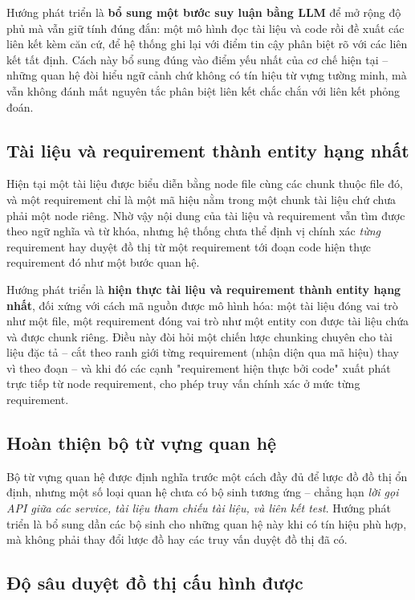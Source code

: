 Hướng phát triển là \textbf{bổ sung một bước suy luận bằng LLM} để mở rộng độ phủ mà vẫn giữ tính đúng đắn: một mô hình đọc tài liệu và code rồi đề xuất các liên kết kèm căn cứ, để hệ thống ghi lại với điểm tin cậy phân biệt rõ với các liên kết tất định. Cách này bổ sung đúng vào điểm yếu nhất của cơ chế hiện tại -- những quan hệ đòi hiểu ngữ cảnh chứ không có tín hiệu từ vựng tường minh, mà vẫn không đánh mất nguyên tắc phân biệt liên kết chắc chắn với liên kết phỏng đoán.

\subsection{Tài liệu và requirement thành entity hạng nhất}

Hiện tại một tài liệu được biểu diễn bằng node file cùng các chunk thuộc file đó, và một requirement chỉ là một mã hiệu nằm trong một chunk tài liệu chứ chưa phải một node riêng. Nhờ vậy nội dung của tài liệu và requirement vẫn tìm được theo ngữ nghĩa và từ khóa, nhưng hệ thống chưa thể định vị chính xác \textit{từng} requirement hay duyệt đồ thị từ một requirement tới đoạn code hiện thực requirement đó như một bước quan hệ.

Hướng phát triển là \textbf{hiện thực tài liệu và requirement thành entity hạng nhất}, đối xứng với cách mã nguồn được mô hình hóa: một tài liệu đóng vai trò như một file, một requirement đóng vai trò như một entity con được tài liệu chứa và được chunk riêng. Điều này đòi hỏi một chiến lược chunking chuyên cho tài liệu đặc tả -- cắt theo ranh giới từng requirement (nhận diện qua mã hiệu) thay vì theo đoạn -- và khi đó các cạnh "requirement hiện thực bởi code" xuất phát trực tiếp từ node requirement, cho phép truy vấn chính xác ở mức từng requirement.

\subsection{Hoàn thiện bộ từ vựng quan hệ}

Bộ từ vựng quan hệ được định nghĩa trước một cách đầy đủ để lược đồ đồ thị ổn định, nhưng một số loại quan hệ chưa có bộ sinh tương ứng -- chẳng hạn \textit{lời gọi API giữa các service, tài liệu tham chiếu tài liệu, và liên kết test}. Hướng phát triển là bổ sung dần các bộ sinh cho những quan hệ này khi có tín hiệu phù hợp, mà không phải thay đổi lược đồ hay các truy vấn duyệt đồ thị đã có.

\subsection{Độ sâu duyệt đồ thị cấu hình được}

